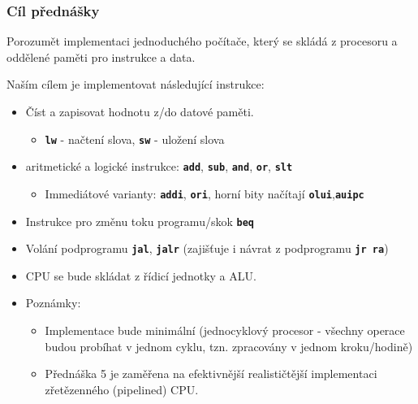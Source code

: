 \begin{frame}
\frametitle{Cíl přednášky}

Porozumět implementaci jednoduchého počítače, který se skládá z procesoru a oddělené paměti pro instrukce a data.

Naším cílem je implementovat následující instrukce:

\begin{itemize}
\item Číst a zapisovat hodnotu z/do datové paměti.
\begin{itemize}
\item \textbf{\texttt{lw}} - načtení slova, \textbf{\texttt{sw}} - uložení slova
\end{itemize}
\item aritmetické a logické instrukce: \textbf{\texttt{add}}, \textbf{\texttt{sub}}, \textbf{\texttt{and}}, \textbf{\texttt{or}}, \textbf{\texttt{slt}}
\begin{itemize}
\item Immediátové varianty: \textbf{\texttt{addi}}, \textbf{\texttt{ori}}, horní bity načítají \textbf{\texttt{olui}},\textbf{\texttt{auipc}}
\end{itemize}
\item Instrukce pro změnu toku programu/skok \textbf{\texttt{beq}}
\item Volání podprogramu \textbf{\texttt{jal}}, \textbf{\texttt{jalr}} (zajišťuje i návrat z podprogramu \textbf{\texttt{jr~ra}})
\item CPU se bude skládat z řídicí jednotky a ALU.
\item Poznámky:
\begin{itemize}
\item Implementace bude minimální (jednocyklový procesor - všechny operace budou probíhat v jednom cyklu, tzn. zpracovány v jednom kroku/hodině)
\item Přednáška 5 je zaměřena na efektivnější realističtější implementaci zřetězenného (pipelined) CPU.
\end{itemize}
\end{itemize}

\end{frame}
